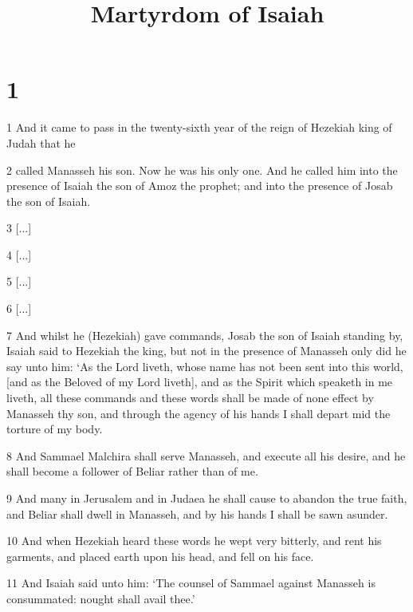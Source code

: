 

\title{Martyrdom of Isaiah}

\chapter{1}

\par 1 And it came to pass in the twenty-sixth year of the reign of Hezekiah king of Judah that he

\par 2 called Manasseh his son. Now he was his only one. And he called him into the presence of Isaiah the son of Amoz the prophet; and into the presence of Josab the son of Isaiah.

\par 3 [...]

\par 4 [...]

\par 5 [...]

\par 6 [...]

\par 7 And whilst he (Hezekiah) gave commands, Josab the son of Isaiah standing by, Isaiah said to Hezekiah the king, but not in the presence of Manasseh only did he say unto him: ‘As the Lord liveth, whose name has not been sent into this world, [and as the Beloved of my Lord liveth], and as the Spirit which speaketh in me liveth, all these commands and these words shall be made of none effect by Manasseh thy son, and through the agency of his hands I shall depart mid the torture of my body.

\par 8 And Sammael Malchira shall serve Manasseh, and execute all his desire, and he shall become a follower of Beliar rather than of me.

\par 9 And many in Jerusalem and in Judaea he shall cause to abandon the true faith, and Beliar shall dwell in Manasseh, and by his hands I shall be sawn asunder.

\par 10 And when Hezekiah heard these words he wept very bitterly, and rent his garments, and placed earth upon his head, and fell on his face.

\par 11 And Isaiah said unto him: ‘The counsel of Sammael against Manasseh is consummated: nought shall avail thee.’

